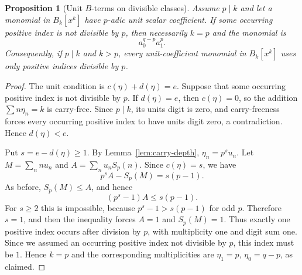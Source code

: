 \documentclass[11pt]{amsart}
\numberwithin{equation}{section}
\newtheorem{proposition}[proposition]{Proposition}
\newcommand{\Sp}{S_p}
\begin{document}
\begin{proposition}[Unit $B$-terms on divisible classes]\label{prop:B-unit-divisible}
Assume $p\mid k$ and let a monomial in $B_k[x^k]$ have $p$-adic unit scalar coefficient.  If some occurring positive index is not divisible by $p$, then necessarily $k=p$ and the monomial is
\[
        a_0^{q-p}a_1^p.
\]
Consequently, if $p\mid k$ and $k>p$, every unit-coefficient monomial in $B_k[x^k]$ uses only positive indices divisible by $p$.
\end{proposition}
\begin{proof}
The unit condition is $c(\eta)+d(\eta)=e$.  Suppose that some occurring positive index is not divisible by $p$.  If $d(\eta)=e$, then $c(\eta)=0$, so the addition $\sum n\eta_n=k$ is carry-free.  Since $p\mid k$, its units digit is zero, and carry-freeness forces every occurring positive index to have units digit zero, a contradiction.  Hence $d(\eta)<e$.

Put $s=e-d(\eta)\ge1$.  By Lemma~\ref{lem:carry-depth}, $\eta_n=p^s u_n$.  Let $M=\sum_nnu_n$ and $A=\sum_nu_n\Sp(n)$.  Since $c(\eta)=s$, we have
\[
        p^sA-\Sp(M)=s(p-1).
\]
As before, $\Sp(M)\le A$, and hence
\[
        (p^s-1)A\le s(p-1).
\]
For $s\ge2$ this is impossible, because $p^s-1>s(p-1)$ for odd $p$.  Therefore $s=1$, and then the inequality forces $A=1$ and $\Sp(M)=1$.  Thus exactly one positive index occurs after division by $p$, with multiplicity one and digit sum one.  Since we assumed an occurring positive index not divisible by $p$, this index must be $1$.  Hence $k=p$ and the corresponding multiplicities are $\eta_1=p$, $\eta_0=q-p$, as claimed.
\end{proof}
\end{document}
